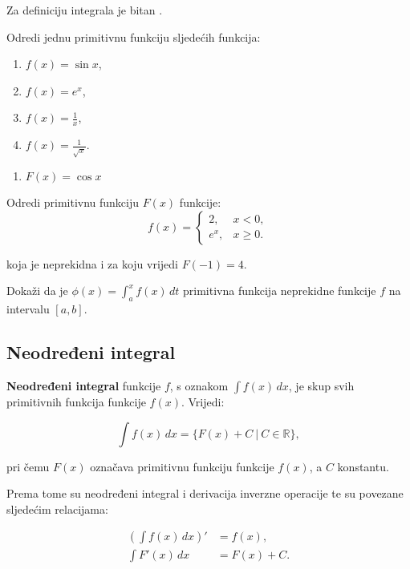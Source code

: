 Za definiciju integrala je bitan .

\begin{example}
    Odredi jednu primitivnu funkciju sljedećih funkcija:
    \begin{enumerate}
        \item $f(x) = \sin x$,
        \item $f(x) = e^x$,
        \item $f(x) = {\frac{1}{x}}$,
        \item $f(x) = {\frac{1}{\sqrt{x}}}$.
    \end{enumerate}
\end{example}

\begin{enumerate}
    \item $F(x) = \cos x$
\end{enumerate}

\begin{example}
    Odredi primitivnu funkciju $F(x)$ funkcije:
    $$
        f(x) = \begin{cases}
            2, & x < 0, \\
            e^x, & x \geq 0.
        \end{cases}
    $$

    koja je neprekidna i za koju vrijedi $F(-1) = 4$.
\end{example}

\begin{example}
    Dokaži da je $\displaystyle \phi(x)=\int_a^x f(x)\,dt$ primitivna funkcija neprekidne funkcije $f$ na intervalu $[a,b]$.
\end{example}

\subsection{Neodređeni integral}

\textbf{Neodređeni integral} funkcije $f$, s oznakom $\int f(x)\,dx$, je skup svih
primitivnih funkcija funkcije $f(x)$. Vrijedi:

$$
\int f(x)\,dx = \{F(x) + C\ |\ C\in\mathbb{R}\},
$$

pri čemu $F(x)$ označava primitivnu funkciju funkcije $f(x)$, a $C$ konstantu.

Prema tome su neodređeni integral i derivacija inverzne operacije te su povezane
sljedećim relacijama:

\begin{align*}
    \left(\int f(x)\,dx\right)' &= f(x),\\
    \int F'(x)\,dx &= F(x) + C.
\end{align*}

